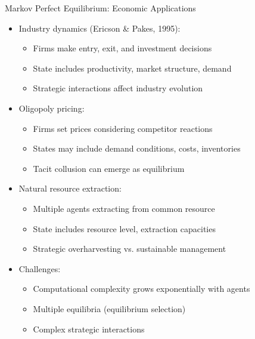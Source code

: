 \documentclass[10pt]{beamer}
\begin{document}
\begin{frame}{Markov Perfect Equilibrium: Economic Applications}
    \begin{itemize}
        \item Industry dynamics (Ericson \& Pakes, 1995):
        \begin{itemize}
            \item Firms make entry, exit, and investment decisions
            \item State includes productivity, market structure, demand
            \item Strategic interactions affect industry evolution
        \end{itemize}
        \vspace{0.2cm}
        \item Oligopoly pricing:
        \begin{itemize}
            \item Firms set prices considering competitor reactions
            \item States may include demand conditions, costs, inventories
            \item Tacit collusion can emerge as equilibrium
        \end{itemize}
        \vspace{0.2cm}
        \item Natural resource extraction:
        \begin{itemize}
            \item Multiple agents extracting from common resource
            \item State includes resource level, extraction capacities
            \item Strategic overharvesting vs. sustainable management
        \end{itemize}
        \vspace{0.2cm}
        \item Challenges:
        \begin{itemize}
            \item Computational complexity grows exponentially with agents
            \item Multiple equilibria (equilibrium selection)
            \item Complex strategic interactions
        \end{itemize}
    \end{itemize}
\end{frame}
\end{document}
